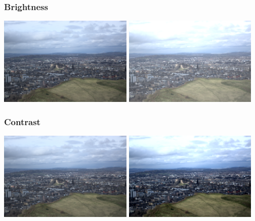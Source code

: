 \documentclass{beamer}
\begin{document}
\begin{frame}
    \frametitle{Brightness}
    \begin{center}
        \includegraphics[width=0.48\textwidth]{default.png}
        \includegraphics[width=0.48\textwidth]{bright.png}
    \end{center}

\end{frame}

\begin{frame}
    \frametitle{Contrast}
    \begin{center}
        \includegraphics[width=0.48\textwidth]{default.png}
        \includegraphics[width=0.48\textwidth]{contrast.png}
    \end{center}

\end{frame}
\end{document}
